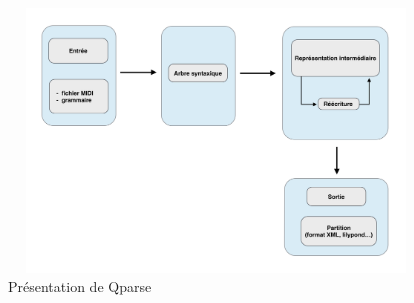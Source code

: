 \begin{figure}[h]
\centering
\includegraphics[height=70mm, width=110mm]{
z_images/3_methodes/1_Analyse_syntaxique/schema_qparse.png}
\caption{Présentation de Qparse}
\label{presentation_qparse}
\end{figure}

